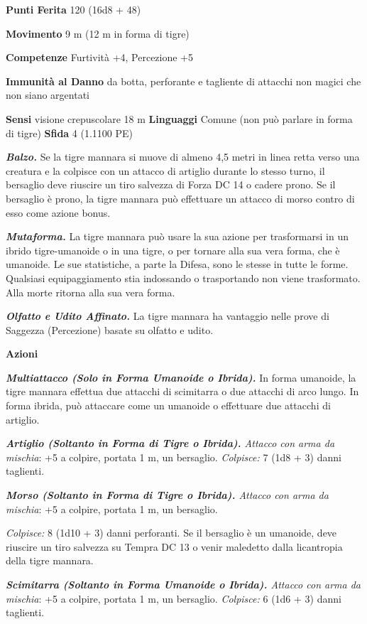 \begin{multicols}{2}
\textbf{Punti Ferita} 120 (16d8 + 48)

\textbf{Movimento} 9 m (12 m in forma di tigre)

\textbf{Competenze} Furtività +4, Percezione +5

\textbf{Immunità al Danno} da botta, perforante e tagliente di
attacchi non magici che non siano argentati

\textbf{Sensi} visione crepuscolare 18 m
\textbf{Linguaggi} Comune (non può parlare in forma di tigre)
\textbf{Sfida} 4 (1.1100 PE)\smallskip

\emph{\textbf{Balzo.}} Se la tigre mannara si muove di almeno 4,5 metri
in linea retta verso una creatura e la colpisce con un attacco di
artiglio durante lo stesso turno, il bersaglio deve riuscire un tiro
salvezza di Forza DC 14 o cadere prono. Se il bersaglio è prono, la
tigre mannara può effettuare un attacco di morso contro di esso come
azione bonus.

\emph{\textbf{Mutaforma.}} La tigre mannara può usare la sua azione per
trasformarsi in un ibrido tigre-umanoide o in una tigre, o per tornare
alla sua vera forma, che è umanoide. Le sue statistiche, a parte la Difesa,
sono le stesse in tutte le forme. Qualsiasi equipaggiamento stia
indossando o trasportando non viene trasformato. Alla morte ritorna alla
sua vera forma.

\emph{\textbf{Olfatto e Udito Affinato.}} La tigre mannara ha vantaggio
nelle prove di Saggezza (Percezione) basate su olfatto e udito.

\smallskip\textbf{Azioni}

\emph{\textbf{Multiattacco (Solo in Forma Umanoide o Ibrida).}} In forma
umanoide, la tigre mannara effettua due attacchi di scimitarra o due
attacchi di arco lungo. In forma ibrida, può attaccare come un umanoide
o effettuare due attacchi di artiglio.

\emph{\textbf{Artiglio (Soltanto in Forma di Tigre o Ibrida).} Attacco
con arma da mischia}: +5 a colpire, portata 1 m, un bersaglio.
\emph{Colpisce:} 7 (1d8 + 3) danni taglienti.

\emph{\textbf{Morso (Soltanto in Forma di Tigre o Ibrida).} Attacco con
arma da mischia}: +5 a colpire, portata 1 m, un bersaglio.

\emph{Colpisce:} 8 (1d10 + 3) danni perforanti. Se il bersaglio è un
umanoide, deve riuscire un tiro salvezza su Tempra DC 13 o venir
maledetto dalla licantropia della tigre mannara.

\emph{\textbf{Scimitarra (Soltanto in Forma Umanoide o Ibrida).} Attacco
con arma da mischia}: +5 a colpire, portata 1 m, un bersaglio.
\emph{Colpisce:} 6 (1d6 + 3) danni taglienti.


\end{multicols}
